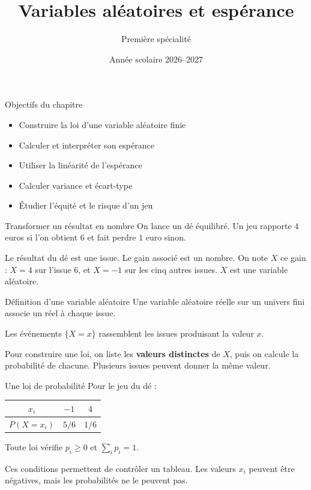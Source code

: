 \documentclass[aspectratio=169,12pt]{beamer}
\title{Variables aléatoires et espérance}
\subtitle{Première spécialité}
\date{Année scolaire 2026--2027}
\begin{document}
\begin{frame}\titlepage\end{frame}
\begin{frame}{Objectifs du chapitre}\begin{itemize}
\item Construire la loi d’une variable aléatoire finie
\item Calculer et interpréter son espérance
\item Utiliser la linéarité de l’espérance
\item Calculer variance et écart-type
\item Étudier l’équité et le risque d’un jeu
\end{itemize}\end{frame}
\renewcommand{\slidekind}{COMPRENDRE}
\begin{frame}[t,fragile]{Transformer un résultat en nombre}
On lance un dé équilibré. Un jeu rapporte $4$ euros si l’on obtient $6$ et fait perdre $1$ euro sinon.\medskip\par Le résultat du dé est une issue. Le gain associé est un nombre. On note $X$ ce gain : $X=4$ sur l’issue $6$, et $X=-1$ sur les cinq autres issues. $X$ est une variable aléatoire.
\end{frame}
\renewcommand{\slidekind}{COMPRENDRE}
\begin{frame}[t,fragile]{Définition d’une variable aléatoire}
Une variable aléatoire réelle sur un univers fini associe un réel à chaque issue.\medskip\par Les événements $\{X=x\}$ rassemblent les issues produisant la valeur $x$.\medskip\par Pour construire une loi, on liste les \textbf{valeurs distinctes} de $X$, puis on calcule la probabilité de chacune. Plusieurs issues peuvent donner la même valeur.
\end{frame}
\renewcommand{\slidekind}{COMPRENDRE}
\begin{frame}[t,fragile]{Une loi de probabilité}
Pour le jeu du dé :\begin{center}\begin{tabular}{c|cc}$x_i$&$-1$&$4$\\\hline$P(X=x_i)$&$5/6$&$1/6$\end{tabular}\end{center}Toute loi vérifie $p_i\ge0$ et $\sum_i p_i=1$.\medskip\par Ces conditions permettent de contrôler un tableau. Les valeurs $x_i$ peuvent être négatives, mais les probabilités ne le peuvent pas.
\end{frame}
\end{document}
